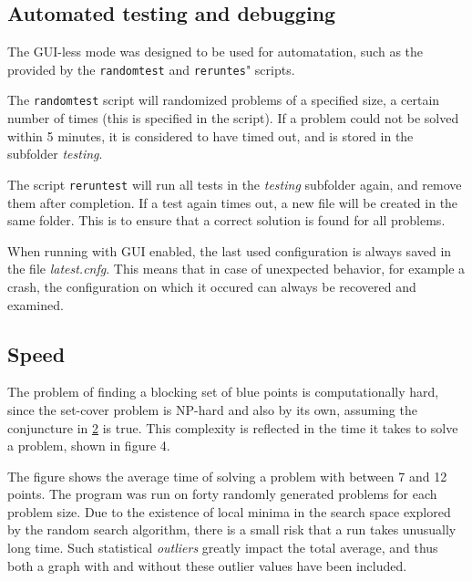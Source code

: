 \documentclass[a4paper,12pt]{article}
\begin{document}
\subsection{Automated testing and debugging}
The GUI-less mode was designed to be used for automatation, such as the provided by the \texttt{randomtest} and \texttt{reruntes}" scripts.

The \texttt{randomtest} script will randomized problems of a specified size, a certain number of times (this is specified in the script). If a problem could not be solved within 5 minutes, it is considered to have timed out, and is stored in the subfolder \emph{testing}.

The script \texttt{reruntest} will run all tests in the \emph{testing} subfolder again, and remove them after completion. If a test again times out, a new file will be created in the same folder. This is to ensure that a correct solution is found for all problems.

When running with GUI enabled, the last used configuration is always saved in the file \emph{latest.cnfg}. This means that in case of unexpected behavior, for example a crash, the configuration on which it occured can always be recovered and examined.

\subsection{Speed}
The problem of finding a blocking set of blue points is computationally hard, since the set-cover problem is NP-hard and also by its own, assuming the conjuncture in \hyperref[ref:blocking]{2} is true. This complexity is reflected in the time it takes to solve a problem, shown in figure 4.

The figure shows the average time of solving a problem with between 7 and 12 points. The program was run on forty randomly generated problems for each problem size. Due to the existence of local minima in the search space explored by the random search algorithm, there is a small risk that a run takes unusually long time. Such statistical \emph{outliers} greatly impact the total average, and thus both a graph with and without these outlier values have been included.
\end{document}
